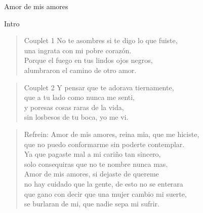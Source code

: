 \begin{song}[vals]{Amor de mis amores}
\begin{instrumental}{Intro}
	  \measure{}\measure{}\measure{\hspace{4.\wlskip}:}
\end{instrumental}

\begin{verse}{Couplet 1}
No te asombres si te digo lo que fuiste,\\
una ingrata con mi pobre corazón.\\
Porque el fuego en tus lindos ojos negros,\\
alumbraron el camino de otro amor.\\
\end{verse}
\begin{verse}{Couplet 2}
Y pensar que te adorava tiernamente,\\
que a tu lado como nunca me senti,\\
y poresas cosas raras de la vida,\\
sin losbesos de tu boca, yo me vi.\\
\end{verse}
\begin{verse}{Refrein:}
Amor de mis amores, reina mia, que me hiciste,\\
que no puedo conformarme sin poderte contemplar.\\
\hspace{1em}Ya que pagaste mal a mi cariño tan sincero,\\
solo consequiras que no te nombre nunca mas.\\
Amor de mis amores, si dejaste de quereme\\
no hay cuidado que la gente, de esto no se enterara\\
\hspace{1em}que gano con decir que una mujer cambio mi suerte,\\
se burlaran de mi, que nadie sepa mi sufrir.
\end{verse}


\end{song}
